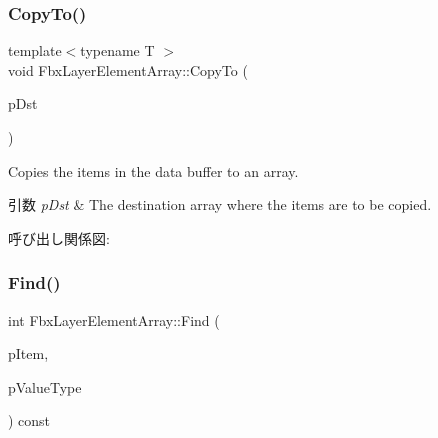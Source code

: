 \mbox{\label{class_fbx_layer_element_array_a64ddf869251ef992f995a5bb9c16efcc}} 
\subsubsection{\texorpdfstring{Copy\+To()}{CopyTo()}}
{\footnotesize\ttfamily template$<$typename T $>$ \\
void Fbx\+Layer\+Element\+Array\+::\+Copy\+To (\begin{DoxyParamCaption}\item[{\hyperlink{class_fbx_array}{Fbx\+Array}$<$ T $>$ \&}]{p\+Dst }\end{DoxyParamCaption})}

Copies the items in the data buffer to an array. 
\begin{DoxyParams}{引数}
{\em p\+Dst} & The destination array where the items are to be copied. \\
\hline
\end{DoxyParams}
呼び出し関係図\+:
\mbox{\label{class_fbx_layer_element_array_ad5075288db8274e13b13f14ec8414dec}} 
\subsubsection{\texorpdfstring{Find()}{Find()}\hspace{0.1cm}{\footnotesize\ttfamily [1/2]}}
{\footnotesize\ttfamily int Fbx\+Layer\+Element\+Array\+::\+Find (\begin{DoxyParamCaption}\item[{const void $\ast$}]{p\+Item,  }\item[{\hyperlink{fbxpropertytypes_8h_a73913a5ddfb20e57c6f25e9e6784bd92}{E\+Fbx\+Type}}]{p\+Value\+Type }\end{DoxyParamCaption}) const}

